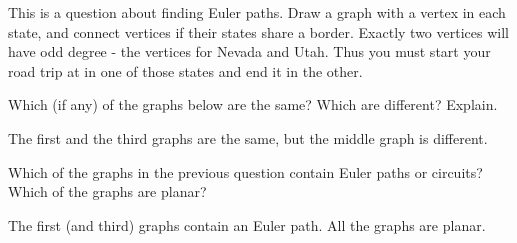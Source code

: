 \begin{questions}
	\begin{answer}
		This is a question about finding Euler paths.  Draw a graph with a vertex in each state, and connect vertices if their states share a border.  Exactly two vertices will have odd degree - the vertices for Nevada and Utah.  Thus you must start your road trip at in one of those states and end it in the other. %
	\end{answer}
	
	
	


\question Which (if any) of the graphs below are the same?  Which are different?  Explain.

\begin{center}
  \hfill
  \hfill
\end{center}

	\begin{answer}
		The first and the third graphs are the same, but the middle graph is different.
	\end{answer}
	
	
	


\question Which of the graphs in the previous question contain Euler paths or circuits?  Which of the graphs are planar?

	\begin{answer}
		The first (and third) graphs contain an Euler path.  All the graphs are planar.
	\end{answer}
	

\end{questions}

